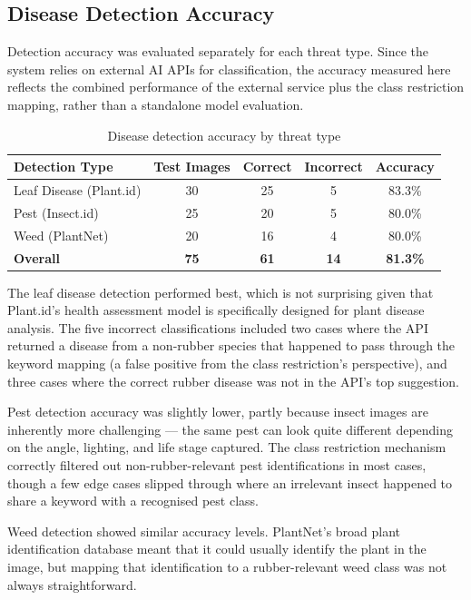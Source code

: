 \subsection{Disease Detection Accuracy}

Detection accuracy was evaluated separately for each threat type. Since the system relies on external AI APIs for classification, the accuracy measured here reflects the combined performance of the external service plus the class restriction mapping, rather than a standalone model evaluation.

\begin{table}[H]
\centering
\caption{Disease detection accuracy by threat type}
\label{tab:detection_accuracy}
\begin{tabular}{|l|c|c|c|c|}
\hline
\textbf{Detection Type} & \textbf{Test Images} & \textbf{Correct} & \textbf{Incorrect} & \textbf{Accuracy} \\
\hline
Leaf Disease (Plant.id) & 30 & 25 & 5 & 83.3\% \\
\hline
Pest (Insect.id) & 25 & 20 & 5 & 80.0\% \\
\hline
Weed (PlantNet) & 20 & 16 & 4 & 80.0\% \\
\hline
\textbf{Overall} & \textbf{75} & \textbf{61} & \textbf{14} & \textbf{81.3\%} \\
\hline
\end{tabular}
\end{table}

The leaf disease detection performed best, which is not surprising given that Plant.id's health assessment model is specifically designed for plant disease analysis. The five incorrect classifications included two cases where the API returned a disease from a non-rubber species that happened to pass through the keyword mapping (a false positive from the class restriction's perspective), and three cases where the correct rubber disease was not in the API's top suggestion.

Pest detection accuracy was slightly lower, partly because insect images are inherently more challenging --- the same pest can look quite different depending on the angle, lighting, and life stage captured. The class restriction mechanism correctly filtered out non-rubber-relevant pest identifications in most cases, though a few edge cases slipped through where an irrelevant insect happened to share a keyword with a recognised pest class.

Weed detection showed similar accuracy levels. PlantNet's broad plant identification database meant that it could usually identify the plant in the image, but mapping that identification to a rubber-relevant weed class was not always straightforward.

